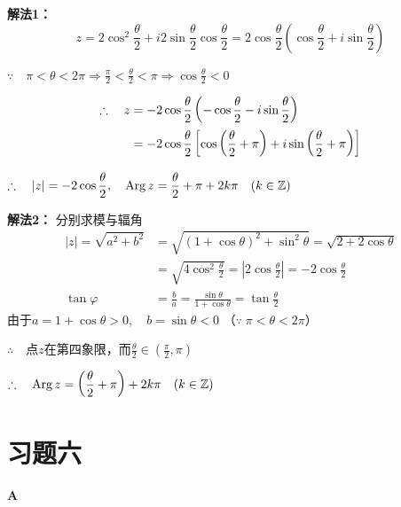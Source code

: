 \begin{solution}
\textbf{解法1：}
\[    z=2\cos^{2}\frac{\theta}{2}+i2\sin\frac{\theta}{2}\cos\frac{\theta}{2}
   =2\cos\frac{\theta}{2}\left(\cos\frac{\theta}{2}+i\sin\frac{\theta}{2}\right)
 \]

$\because\quad \pi<\theta<2\pi \Rightarrow \frac{\pi}{2}<\frac{\theta}{2}<\pi\Rightarrow \cos\frac{\theta}{2}<0$

\[\begin{split}
    \therefore\quad z&=-2\cos\dfrac{\theta}{2}\left(-\cos\dfrac{\theta}{2}-i\sin\dfrac{\theta}{2}\right)\\
    &=-2\cos\dfrac{\theta}{2}\left[\cos\left(\dfrac{\theta}{2}+\pi\right)+i\sin\left(\dfrac{\theta}{2}+\pi\right)\right]
\end{split}\]

$\therefore\quad |z|=-2\cos\dfrac{\theta}{2},\quad {\rm Arg\,}z=\dfrac{\theta}{2}+\pi+2k\pi\quad (k\in\mathbb{Z})$
    
\textbf{解法2：} 分别求模与辐角
\[\begin{split}
    |z|=\sqrt{a^2+b^2}&=\sqrt{(1+\cos\theta)^2+\sin^2\theta}=\sqrt{2+2\cos\theta}\\
    &=\sqrt{4\cos^2\frac{\theta}{2}}=\left|2\cos\frac{\theta}{2}\right|=-2\cos\frac{\theta}{2}\\
    \tan\varphi&=\frac{b}{a}=\frac{\sin\theta}{1+\cos\theta}=\tan\frac{\theta}{2}
\end{split}\]
由于$a=1+\cos\theta>0,\quad b=\sin\theta<0$  （$\because\; \pi<\theta<2\pi$）

$\therefore\quad $点$z$在第四象限，而$\frac{\theta}{2}\in\left(\frac{\pi}{2},\pi\right)$

$\therefore\quad {\rm Arg\, }z=\left(\dfrac{\theta}{2}+\pi\right)+2k\pi\quad (k\in\mathbb{Z})$
\end{solution}

\section*{习题六}
\begin{center}
    \bfseries A
\end{center}

